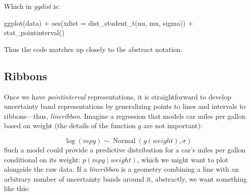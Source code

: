 \documentclass[journal]{vgtc}              %
\newenvironment{centerverbatim}{%
  \hfill\break
  \small
  \centering
  \varwidth{\linewidth}%
  \verbatim
}{%
  \endverbatim
  \endvarwidth
  \par
  \hfill\break
}
\begin{document}
Which in \textit{ggdist} is:

\begin{centerverbatim}
ggplot(data) +
  aes(xdist = dist_student_t(nu, mu, sigma)) +
  stat_pointinterval()
\end{centerverbatim}

Thus the code matches up closely to the abstract notation.

\subsection{Ribbons}

Once we have \textit{pointinterval} representations, it is straightforward to develop uncertainty band representations by generalizing points to lines and intervals to ribbons---thus, \textit{lineribbon}. Imagine a regression that models car miles per gallon based on weight (the details of the function $g$ are not important):

\[
\log(\mathit{mpg}) \sim \operatorname{Normal}\left(g(\mathit{weight}), \sigma\right)
\]
Such a model could provide a predictive distribution for a car's miles per gallon conditional on its weight: $p(\mathit{mpg} \mid \mathit{weight})$, which we might want to plot alongside the raw data. If a \textit{lineribbon} is a geometry combining a line with an arbitrary number of uncertainty bands around it, abstractly, we want something like this:
\end{document}
